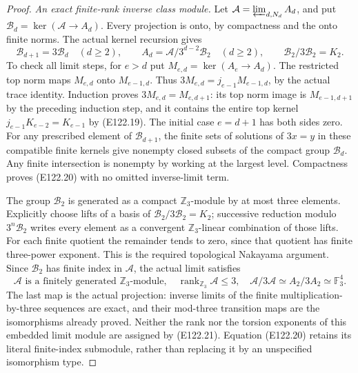 \begin{proof}
\emph{An exact finite-rank inverse class module.}
Let $\mathcal A=\varprojlim_{d,N_d}A_d$, and put
$\mathcal B_d=\ker(\mathcal A\to A_d)$.
Every projection is onto, by compactness and the onto finite norms.
The actual kernel recursion gives
\[
 \mathcal B_{d+1}=3\mathcal B_d\quad(d\ge2),
 \qquad
 A_d=\mathcal A/3^{d-2}\mathcal B_2\quad(d\ge2),
 \qquad\mathcal B_2/3\mathcal B_2=K_2.
 \tag{E122.20}
\]
To check all limit steps, for $e>d$ put
$M_{e,d}=\ker(A_e\to A_d)$. The restricted top norm maps
$M_{e,d}$ onto $M_{e-1,d}$. Thus
$3M_{e,d}=j_{e-1}M_{e-1,d}$, by the actual trace identity.
Induction proves $3M_{e,d}=M_{e,d+1}$: its top norm image is
$M_{e-1,d+1}$ by the preceding induction step, and it contains
the entire top kernel $j_{e-1}K_{e-2}=K_{e-1}$ by (E122.19).
The initial case $e=d+1$ has both sides zero.
For any prescribed element of $\mathcal B_{d+1}$, the finite
sets of solutions of $3x=y$ in these compatible finite kernels
give nonempty closed subsets of the compact group $\mathcal B_d$.
Any finite intersection is nonempty by working at the largest level.
Compactness proves (E122.20) with no omitted inverse-limit term.

The group $\mathcal B_2$ is generated as a compact
$\mathbb Z_3$-module by at most three elements. Explicitly choose
lifts of a basis of $\mathcal B_2/3\mathcal B_2=K_2$; successive
reduction modulo $3^n\mathcal B_2$ writes every element as a
convergent $\mathbb Z_3$-linear combination of those lifts.
For each finite quotient the remainder tends to zero, since that
quotient has finite three-power exponent. This is the required
topological Nakayama argument. Since $\mathcal B_2$ has finite
index in $\mathcal A$, the actual limit satisfies
\[
 \mathcal A\text{ is a finitely generated }\mathbb Z_3\text{-module},
 \quad\operatorname{rank}_{\mathbb Z_3}\mathcal A\le3,
 \quad\mathcal A/3\mathcal A\simeq A_2/3A_2\simeq\mathbb F_3^4.
 \tag{E122.21}
\]
The last map is the actual projection: inverse limits of the finite
multiplication-by-three sequences are exact, and their mod-three
transition maps are the isomorphisms already proved. Neither the
rank nor the torsion exponents of this embedded limit module are
assigned by (E122.21). Equation (E122.20) retains its literal
finite-index submodule, rather than replacing it by an unspecified
isomorphism type.


\end{proof}
